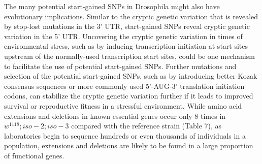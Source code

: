 The many potential start-gained SNPs in Drosophila might also have evolutionary implications. Similar to the cryptic genetic variation that is revealed by stop-lost mutations in the 3' UTR, start-gained SNPs reveal cryptic genetic variation in the 5' UTR. Uncovering the cryptic genetic variation in times of environmental stress, such as by inducing transcription initiation at start sites upstream of the normally-used transcription start sites, could be one mechanism to facilitate the use of potential start-gained SNPs. Further mutations and selection of the potential start-gained SNPs, such as by introducing better Kozak consensus sequences or more commonly used 5'-AUG-3' translation initiation codons, can stabilize the cryptic genetic variation further if it leads to improved survival or reproductive fitness in a stressful environment. While amino acid extensions and deletions in known essential genes occur only 8 times in $w^{1118} ; iso-2; iso-3$ compared with the reference strain (Table 7), as laboratories begin to sequence hundreds or even thousands of individuals in a population, extensions and deletions are likely to be found in a large proportion of functional genes.

